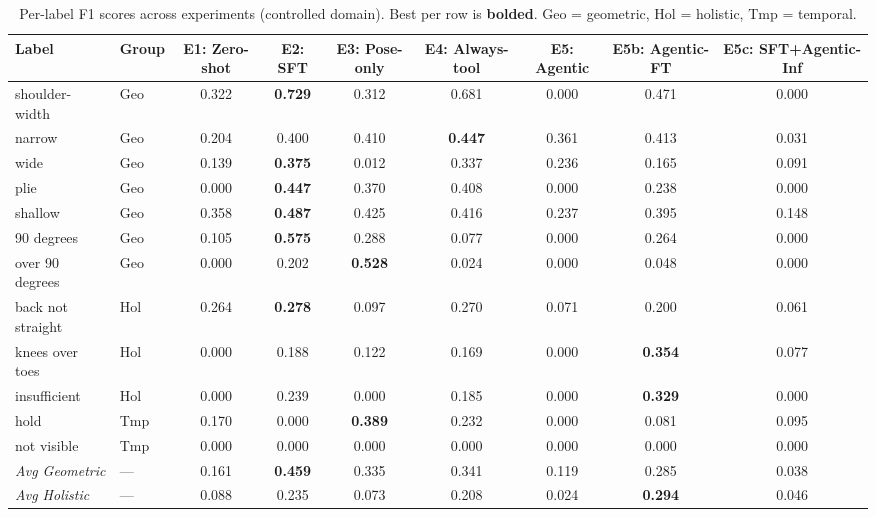 \begin{table}[t]
\centering
\caption{Per-label F1 scores across experiments (controlled domain). Best per row is \textbf{bolded}. Geo = geometric, Hol = holistic, Tmp = temporal.}
\label{tab:per-label}
\small
\begin{tabular}{llccccccc}
\toprule
Label & Group & E1: Zero-shot & E2: SFT & E3: Pose-only & E4: Always-tool & E5: Agentic & E5b: Agentic-FT & E5c: SFT+Agentic-Inf \\
\midrule
shoulder-width & Geo & 0.322 & \textbf{0.729} & 0.312 & 0.681 & 0.000 & 0.471 & 0.000 \\
narrow & Geo & 0.204 & 0.400 & 0.410 & \textbf{0.447} & 0.361 & 0.413 & 0.031 \\
wide & Geo & 0.139 & \textbf{0.375} & 0.012 & 0.337 & 0.236 & 0.165 & 0.091 \\
plie & Geo & 0.000 & \textbf{0.447} & 0.370 & 0.408 & 0.000 & 0.238 & 0.000 \\
shallow & Geo & 0.358 & \textbf{0.487} & 0.425 & 0.416 & 0.237 & 0.395 & 0.148 \\
90 degrees & Geo & 0.105 & \textbf{0.575} & 0.288 & 0.077 & 0.000 & 0.264 & 0.000 \\
over 90 degrees & Geo & 0.000 & 0.202 & \textbf{0.528} & 0.024 & 0.000 & 0.048 & 0.000 \\
back not straight & Hol & 0.264 & \textbf{0.278} & 0.097 & 0.270 & 0.071 & 0.200 & 0.061 \\
knees over toes & Hol & 0.000 & 0.188 & 0.122 & 0.169 & 0.000 & \textbf{0.354} & 0.077 \\
insufficient & Hol & 0.000 & 0.239 & 0.000 & 0.185 & 0.000 & \textbf{0.329} & 0.000 \\
hold & Tmp & 0.170 & 0.000 & \textbf{0.389} & 0.232 & 0.000 & 0.081 & 0.095 \\
not visible & Tmp & 0.000 & 0.000 & 0.000 & 0.000 & 0.000 & 0.000 & 0.000 \\
\midrule
\textit{Avg Geometric} & --- & 0.161 & \textbf{0.459} & 0.335 & 0.341 & 0.119 & 0.285 & 0.038 \\
\textit{Avg Holistic} & --- & 0.088 & 0.235 & 0.073 & 0.208 & 0.024 & \textbf{0.294} & 0.046 \\
\bottomrule
\end{tabular}
\end{table}
